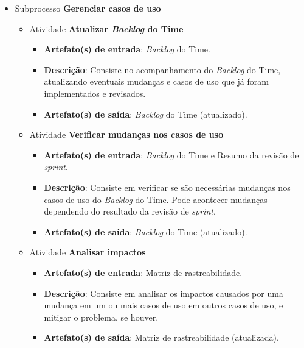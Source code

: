 \begin{itemize}
     \item Subprocesso \textbf{Gerenciar casos de uso}
     
	\begin{itemize}
	 
	 \item Atividade \textbf{Atualizar \textit{Backlog} do Time}
	    
	    \begin{itemize}
	      \item \textbf{Artefato(s) de entrada}: \textit{Backlog} do Time.

	      \item \textbf{Descrição}: Consiste no acompanhamento do \textit{Backlog} do Time, atualizando eventuais
		mudanças e casos de uso que já foram implementados e revisados.
	      
	      \item \textbf{Artefato(s) de saída}: \textit{Backlog} do Time (atualizado).
		    
	    \end{itemize}
	    
	 \item Atividade \textbf{Verificar mudanças nos casos de uso}
	    
	    \begin{itemize}
	      \item \textbf{Artefato(s) de entrada}: \textit{Backlog} do Time e Resumo da revisão de \textit{sprint}.

	      \item \textbf{Descrição}: Consiste em verificar se são necessárias mudanças nos casos de uso do \textit{Backlog}
		do Time. Pode acontecer mudanças dependendo do resultado da revisão de \textit{sprint}.
	      
	      \item \textbf{Artefato(s) de saída}: \textit{Backlog} do Time (atualizado).
		    
	    \end{itemize}
	    
	 \item Atividade \textbf{Analisar impactos}
	    
	    \begin{itemize}
	      \item \textbf{Artefato(s) de entrada}: Matriz de rastreabilidade.

	      \item \textbf{Descrição}: Consiste em analisar os impactos causados por uma mudança em um ou mais casos de uso
	       em outros casos de uso, e mitigar o problema, se houver.
	      
	      \item \textbf{Artefato(s) de saída}: Matriz de rastreabilidade (atualizada).
		    
	    \end{itemize}
	    
	\end{itemize}
	     
    \end{itemize}